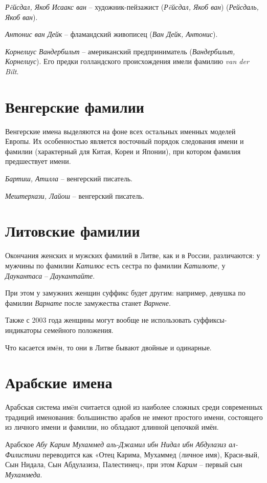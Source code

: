 \emph{Р\"eйсдал, Якоб Исаакс ван} -- художник-пейзажист (\emph{Р\"eйсдал, Якоб ван}) (\emph{Рейсдаль, Якоб ван}).

\emph{Антонис ван Дейк} -- фламандский живописец (\emph{Ван Дейк, Антонис}).

\emph{Корнелиус Вандербильт} -- американский предприниматель (\emph{Вандербильт, Корнелиус}). Его предки голландского происхождения имели фамилию \emph{van der Bilt}.


\section{Венгерские фамилии}

Венгерские имена выделяются на фоне всех остальных именных моделей Европы. Их особенностью является восточный порядок следования имени и фамилии (характерный для Китая, Кореи и Японии), при котором фамилия предшествует имени. 

\emph{Бартиш, Атилла} -- венгерский писатель.

\emph{Мештерхази, Лайош} -- венгерский писатель.

\section{Литовские фамилии}

Окончания женских и мужских фамилий в Литве, как и в России, различаются: у мужчины по фамилии \emph{Катилюс} есть сестра по фамилии \emph{Катилюте}, у \emph{Даукантаса} -- \emph{Даукантайте}.

При этом у замужних женщин суффикс будет другим: например, девушка по фамилии \emph{Варнате} после замужества станет \emph{Варнене}.

Также с 2003 года женщины могут вообще не использовать суффиксы-индикаторы семейного положения.

Что касается им\"eн, то они в Литве бывают двойные и одинарные.

\section{Арабские имена}

Арабская система им\"eн считается одной из наиболее сложных среди современных традиций именования: большинство арабов не имеют простого имени, состоящего из личного имени и фамилии, но обладают длинной цепочкой имён.

Арабское \emph{Абу Карим Мухаммед аль-Джамил ибн Нидал ибн Абдулазиз ал-Филистини} переводится как «Отец Карима, Мухаммед (личное имя), Краси-вый, Сын Нидала, Сын Абдулазиза, Палестинец», при этом \emph{Карим} -- первый сын \emph{Мухаммеда}.

